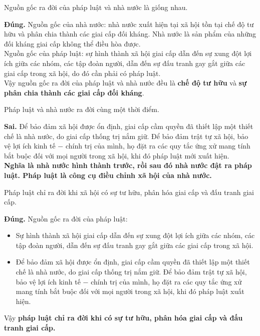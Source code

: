 \begin{ques}
Nguồn gốc ra đời của pháp luật và nhà nước là giống nhau.
\end{ques}
\begin{ans}
\textbf{Đúng.} Nguồn gốc của nhà nước: nhà nước xuất hiện tại xã hội tồn tại chế độ tư hữu và phân chia thành các giai cấp đối kháng. Nhà nước là sản phẩm của những đối kháng giai cấp không thể điều hòa được.\\
Nguồn gốc của pháp luật: sự hình thành xã hội giai cấp dẫn đến sự xung đột lợi ích giữa các nhóm, các tập đoàn người, dẫn đến sự đấu tranh gay gắt giữa các giai cấp trong xã hội, do đó cần phải có pháp luật.\\
Vậy nguồn gốc ra đời của pháp luật và nhà nước đều là \textbf{chế độ tư hữu} và \textbf{sự phân chia thành các giai cấp đối kháng}.
\end{ans}

\begin{ques}
Pháp luật và nhà nước ra đời cùng một thời điểm.
\end{ques}
\begin{ans}
\textbf{Sai.} Để bảo đảm xã hội được ổn định, giai cấp cầm quyền đã thiết lập một thiết chế là nhà nước, do giai cấp thống trị nắm giữ. Để bảo đảm trật tự xã hội, bảo vệ lợi ích kinh tế $-$ chính trị của mình, họ đặt ra các quy tắc ứng xử mang tính bắt buộc đối với mọi người trong xã hội, khi đó pháp luật mới xuất hiện.\\
\textbf{Nghĩa là nhà nước hình thành trước, rồi sau đó nhà nước đật ra pháp luật. Pháp luật là công cụ điều chỉnh xã hội của nhà nước.}
\end{ans}

\begin{ques}
Pháp luật chỉ ra đời khi xã hội có sự tư hữu, phân hóa giai cấp và đấu tranh giai cấp.
\end{ques}
\begin{ans}
\textbf{Đúng.} Nguồn gốc ra đời của pháp luật:
\begin{itemize}
\item Sự hình thành xã hội giai cấp dẫn đến sự xung đột lợi ích giữa các nhóm, các tập đoàn người, dẫn đến sự đấu tranh gay gắt giữa các giai cấp trong xã hội.
\item Để bảo đảm xã hội được ổn định, giai cấp cầm quyền đã thiết lập một thiết chế là nhà nước, do giai cấp thống trị nắm giữ. Để bảo đảm trật tự xã hội, bảo vệ lợi ích kinh tế $-$ chính trị của mình, họ đặt ra các quy tắc ứng xử mang tính bắt buộc đối với mọi người trong xã hội, khi đó pháp luật xuất hiện.
\end{itemize}
Vậy \textbf{pháp luật chỉ ra đời khi có sự tư hữu, phân hóa giai cấp và đấu tranh giai cấp.}
\end{ans}

